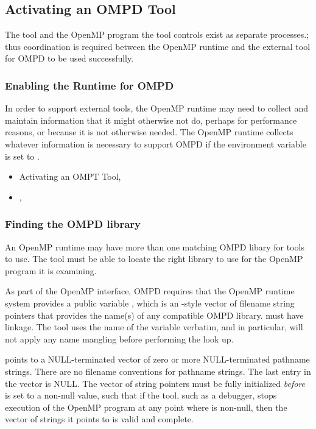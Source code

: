 \subsection{Activating an OMPD Tool}
\label{subsec:activating}

The tool and the OpenMP program the tool controls
exist as separate processes.; thus coordination is required between the OpenMP runtime
and the external tool for OMPD to be used successfully.

\subsubsection{Enabling the Runtime for OMPD}
\label{subsubsec:enabling-ompd}

In order to support external tools, the OpenMP runtime may need to collect
and maintain information that it might otherwise not do, perhaps
for performance reasons, or because it is not otherwise needed.
The OpenMP runtime collects whatever information is necessary
to support OMPD if the environment variable  is set to .

\crossreferences
\begin{itemize}
\item
  Activating an OMPT Tool, 
\item
  , 
\end{itemize}

\subsubsection{Finding the OMPD library}
\label{subsubsec:finding-the-ompd}

An OpenMP runtime may have more than one matching OMPD libary for
tools to use.
The tool must be able to locate the right library to use
for the OpenMP program it is examining.

As part of the OpenMP interface, OMPD requires that the OpenMP
runtime system provides a public variable ,
which is an -style vector of filename string pointers that
provides the name(s) of any compatible OMPD library.
 must have  linkage.
The tool uses the name of the variable verbatim,
and in particular, will not apply any name mangling before
performing the look up.

 points to a NULL-terminated
vector of zero or more NULL-terminated pathname strings.
There are no filename conventions for pathname strings.
The last entry in the vector is NULL.
The vector of string pointers must be fully initialized \emph{before}
 is set to a non-null value,
such that if the tool, such as a debugger,
stops execution of the OpenMP program at any point where
 is non-null,
then the vector of strings it points to is valid and complete.

